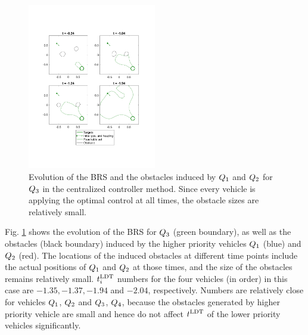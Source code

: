 \begin{figure}[h]
  \centering
  \includegraphics[width=0.5\textwidth]{"fig/cc_rs3"}
  \caption{Evolution of the BRS and the obstacles induced by $Q_1$ and $Q_2$ for $Q_3$ in the centralized controller method. Since every vehicle is applying the optimal control at all times, the obstacle sizes are relatively small.}
  \label{fig:cc_rs3}
\end{figure}

Fig. \ref{fig:cc_rs3} shows the evolution of the BRS for $Q_3$ (green boundary), as well as the obstacles (black boundary) induced by the higher priority vehicles $Q_1$ (blue) and $Q_2$ (red). The locations of the induced obstacles at different time points include the actual positions of $Q_1$ and $Q_2$ at those times, and the size of the obstacles remains relatively small. $t^\text{LDT}_i$ numbers for the four vehicles (in order) in this case are $-1.35, -1.37, -1.94$ and $-2.04$, respectively. Numbers are relatively close for vehicles $Q_1$, $Q_2$ and $Q_3$, $Q_4$, because the obstacles generated by higher priority vehicle are small and hence do not affect $t^\text{LDT}$ of the lower priority vehicles significantly. 

